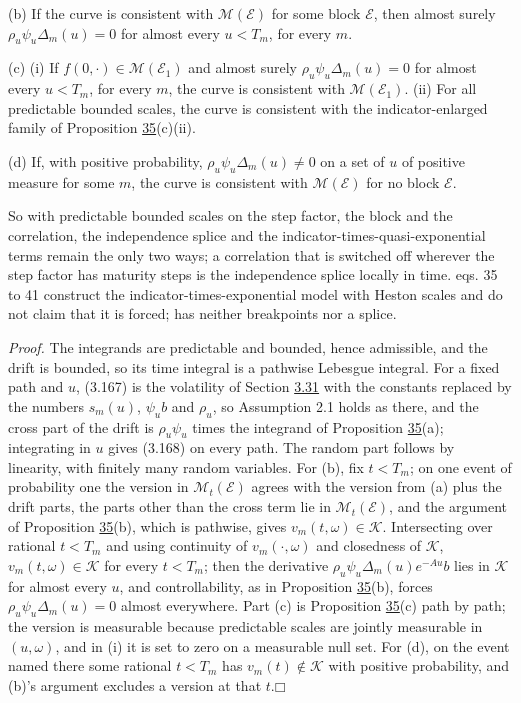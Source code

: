 \documentclass[11pt]{article}
\providecommand{\square}{\mdlgwhtsquare}
\begin{document}
(b) If the curve is consistent with \(\mathcal M(\mathcal E)\) for some block \(\mathcal E\), then almost surely \(\rho_u\psi_u\Delta_m(u)=0\) for almost every \(u<T_m\), for every \(m\).

(c) (i) If \(f(0,\cdot)\in\mathcal M(\mathcal E_1)\) and almost surely \(\rho_u\psi_u\Delta_m(u)=0\) for almost every \(u<T_m\), for every \(m\), the curve is consistent with \(\mathcal M(\mathcal E_1)\). (ii) For all predictable bounded scales, the curve is consistent with the indicator-enlarged family of Proposition \hyperref[res:Proposition-35]{35}(c)(ii).

(d) If, with positive probability, \(\rho_u\psi_u\Delta_m(u)\neq0\) on a set of \(u\) of positive measure for some \(m\), the curve is consistent with \(\mathcal M(\mathcal E)\) for no block \(\mathcal E\).

So with predictable bounded scales on the step factor, the block and the correlation, the independence splice and the indicator-times-quasi-exponential terms remain the only two ways; a correlation that is switched off wherever the step factor has maturity steps is the independence splice locally in time. \cite{brace2024sofr} eqs. 35 to 41 construct the indicator-times-exponential model with Heston scales and do not claim that it is forced; \cite{bjork2004finite} has neither breakpoints nor a splice.

\emph{Proof.} The integrands are predictable and bounded, hence admissible, and the drift is bounded, so its time integral is a pathwise Lebesgue integral. For a fixed path and \(u\), (3.167) is the volatility of Section \hyperref[sec:3.31]{3.31} with the constants replaced by the numbers \(s_m(u)\), \(\psi_ub\) and \(\rho_u\), so Assumption 2.1 holds as there, and the cross part of the drift is \(\rho_u\psi_u\) times the integrand of Proposition \hyperref[res:Proposition-35]{35}(a); integrating in \(u\) gives (3.168) on every path. The random part follows by linearity, with finitely many random variables. For (b), fix \(t<T_m\); on one event of probability one the version in \(\mathcal M_t(\mathcal E)\) agrees with the version from (a) plus the drift parts, the parts other than the cross term lie in \(\mathcal M_t(\mathcal E)\), and the argument of Proposition \hyperref[res:Proposition-35]{35}(b), which is pathwise, gives \(v_m(t,\omega)\in\mathcal K\). Intersecting over rational \(t<T_m\) and using continuity of \(v_m(\cdot,\omega)\) and closedness of \(\mathcal K\), \(v_m(t,\omega)\in\mathcal K\) for every \(t<T_m\); then the derivative \(\rho_u\psi_u\Delta_m(u)e^{-Au}b\) lies in \(\mathcal K\) for almost every \(u\), and controllability, as in Proposition \hyperref[res:Proposition-35]{35}(b), forces \(\rho_u\psi_u\Delta_m(u)=0\) almost everywhere. Part (c) is Proposition \hyperref[res:Proposition-35]{35}(c) path by path; the version is measurable because predictable scales are jointly measurable in \((u,\omega)\), and in (i) it is set to zero on a measurable null set. For (d), on the event named there some rational \(t<T_m\) has \(v_m(t)\notin\mathcal K\) with positive probability, and (b)'s argument excludes a version at that \(t\).\hfill$\square$
\end{document}
